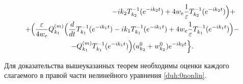 \begin{multline*}
\;\hspace{4cm}

-ik_2T^{-1}_{k_2}(e^{-ik_2t})+4w_e\frac{1}{\varepsilon}T^{-1}_{k_2}(e^{-ik_2t})\Bigr)+

\\

+\Bigl(\frac\varepsilon{4w_e}Q_{k_1}^{(m)}\Bigl(\frac{d}{dt}T^{-1}_{k_1}(e^{-ik_1t})-ik_1T^{-1}_{k_1}(e^{-ik_1t})+4w_e\frac{1}{\varepsilon}T^{-1}_{k_1}(e^{-ik_1t})\Bigr)-

\\

-Q_{k_1}^{(m)}T^{-1}_{k_1}(e^{-ik_1t})\Bigr)(u_{k_2}^0+w^0_{k_2})e^{-ik_2t}\Bigr\}.

\end{multline*}



\smallskip




Для доказательства вышеуказанных теорем необходимы оценки каждого слагаемого в правой части нелинейного уравнения \eqref{duh:0nonlin}. 







\hypertarget{dukh:lemma4}{}

\smallskip

